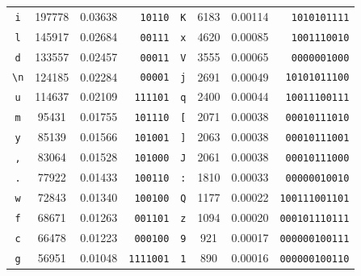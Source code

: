 \begin{table}[htb!]
\begin{tabular}{c S[table-format=7.0] S[table-format=1.5] r|c S[table-format=7.0] S[table-format=1.5] r}
        \texttt{i}                & 197778  & 0.03638 & \texttt{10110}    & \texttt{K}                & 6183    & 0.00114 & \texttt{1010101111}                  \\
        \texttt{l}                & 145917  & 0.02684 & \texttt{00111}    & \texttt{x}                & 4620    & 0.00085 & \texttt{1001110010}                  \\
        \texttt{d}                & 133557  & 0.02457 & \texttt{00011}    & \texttt{V}                & 3555    & 0.00065 & \texttt{0000001000}                  \\
        \verb|\n|                 & 124185  & 0.02284 & \texttt{00001}    & \texttt{j}                & 2691    & 0.00049 & \texttt{10101011100}                 \\
        \texttt{u}                & 114637  & 0.02109 & \texttt{111101}   & \texttt{q}                & 2400    & 0.00044 & \texttt{10011100111}                 \\
        \texttt{m}                & 95431   & 0.01755 & \texttt{101110}   & \verb|[|                  & 2071    & 0.00038 & \texttt{00010111010}                 \\
        \texttt{y}                & 85139   & 0.01566 & \texttt{101001}   & \texttt{]}                & 2063    & 0.00038 & \texttt{00010111001}                 \\
        \texttt{,}                & 83064   & 0.01528 & \texttt{101000}   & \texttt{J}                & 2061    & 0.00038 & \texttt{00010111000}                 \\
        \texttt{.}                & 77922   & 0.01433 & \texttt{100110}   & \texttt{:}                & 1810    & 0.00033 & \texttt{00000010010}                 \\
        \texttt{w}                & 72843   & 0.01340 & \texttt{100100}   & \texttt{Q}                & 1177    & 0.00022 & \texttt{100111001101}                \\
        \texttt{f}                & 68671   & 0.01263 & \texttt{001101}   & \texttt{z}                & 1094    & 0.00020 & \texttt{000101110111}                \\
        \texttt{c}                & 66478   & 0.01223 & \texttt{000100}   & \texttt{9}                & 921     & 0.00017 & \texttt{000000100111}                \\
        \texttt{g}                & 56951   & 0.01048 & \texttt{1111001}  & \texttt{1}                & 890     & 0.00016 & \texttt{000000100110}                \\

\end{tabular}
\end{table}
